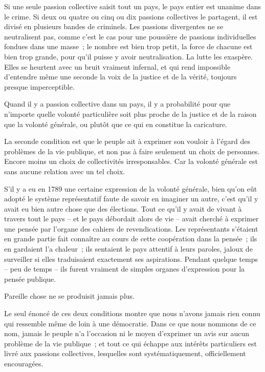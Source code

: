 \documentclass[french,twoside]{book} %
\begin{document}
Si une seule passion collective saisit tout un pays, le pays entier est unanime dans le crime. Si deux ou quatre ou cinq ou dix passions collectives le partagent, il est divisé en plusieurs bandes de criminels. Les passions divergentes ne se neutralisent pas, comme c’est le cas pour une poussière de passions individuelles fondues dans une masse ; le nombre est bien trop petit, la force de chacune est bien trop grande, pour qu’il puisse y avoir neutralisation. La lutte les exaspère. Elles se heurtent avec un bruit vraiment infernal, et qui rend impossible d’entendre même une seconde la voix de la justice et de la vérité, toujours presque imperceptible.\par
Quand il y a passion collective dans un pays, il y a probabilité pour que n’importe quelle volonté particulière soit plus proche de la justice et de la raison que la volonté générale, ou plutôt que ce qui en constitue la caricature.\par
La seconde condition est que le peuple ait à exprimer son vouloir à l’égard des problèmes de la vie publique, et non pas à faire seulement un choix de personnes. Encore moins un choix de collectivités irresponsables. Car la volonté générale est sans aucune relation avec un tel choix.\par
S’il y a eu en 1789 une certaine expression de la volonté générale, bien qu’on eût adopté le système représentatif faute de savoir en imaginer un autre, c’est qu’il y avait eu bien autre chose que des élections. Tout ce qu’il y avait de vivant à travers tout le pays – et le pays débordait alors de vie – avait cherché à exprimer une pensée par l’organe des cahiers de revendications. Les représentants s’étaient en grande partie fait connaître au cours de cette coopération dans la pensée ; ils en gardaient l’a chaleur ; ils sentaient le pays attentif à leurs paroles, jaloux de surveiller si elles traduisaient exactement ses aspirations. Pendant quelque temps – peu de temps – ils furent vraiment de simples organes d’expression pour la pensée publique.\par
Pareille chose ne se produisit jamais plus.\par
Le seul énoncé de ces deux conditions montre que nous n’avons jamais rien connu qui ressemble même de loin à une démocratie. Dans ce que nous nommons de ce nom, jamais le peuple n’a l’occasion ni le moyen d’exprimer un avis sur aucun problème de la vie publique ; et tout ce qui échappe aux intérêts particuliers est livré aux passions collectives, lesquelles sont systématiquement, officiellement encouragées.\par
\end{document}
